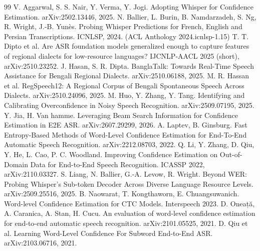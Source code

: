 \documentclass[10pt]{article}
\begin{document}
\begin{thebibliography}{99}
 V. Aggarwal, S. S. Nair, Y. Verma, Y. Jogi. Adopting Whisper for Confidence Estimation. arXiv:2502.13446, 2025.
 N. Ballier, L. Burin, B. Namdarzadeh, S. Ng, R. Wright, J.-B. Yunès. Probing Whisper Predictions for French, English and Persian Transcriptions. ICNLSP, 2024. (ACL Anthology 2024.icnlsp-1.15)
 T. T. Dipto et al. Are ASR foundation models generalized enough to capture features of regional dialects for low-resource languages? IJCNLP-AACL 2025 (short), arXiv:2510.23252.
 J. Hasan, S. R. Dipta. BanglaTalk: Towards Real-Time Speech Assistance for Bengali Regional Dialects. arXiv:2510.06188, 2025.
 M. R. Hassan et al. RegSpeech12: A Regional Corpus of Bengali Spontaneous Speech Across Dialects. arXiv:2510.24096, 2025.
 M. Huo, Y. Zhang, Y. Tang. Identifying and Calibrating Overconfidence in Noisy Speech Recognition. arXiv:2509.07195, 2025.
 Y. Jia, H. Van hamme. Leveraging Beam Search Information for Confidence Estimation in E2E ASR. arXiv:2607.29299, 2026.
 A. Laptev, B. Ginsburg. Fast Entropy-Based Methods of Word-Level Confidence Estimation for End-To-End Automatic Speech Recognition. arXiv:2212.08703, 2022.
 Q. Li, Y. Zhang, D. Qiu, Y. He, L. Cao, P. C. Woodland. Improving Confidence Estimation on Out-of-Domain Data for End-to-End Speech Recognition. ICASSP 2022, arXiv:2110.03327.
 S. Liang, N. Ballier, G.-A. Levow, R. Wright. Beyond WER: Probing Whisper's Sub-token Decoder Across Diverse Language Resource Levels. arXiv:2509.25516, 2025.
 B. Naowarat, T. Kongthaworn, E. Chuangsuwanich. Word-level Confidence Estimation for CTC Models. Interspeech 2023.
 D. Oneață, A. Caranica, A. Stan, H. Cucu. An evaluation of word-level confidence estimation for end-to-end automatic speech recognition. arXiv:2101.05525, 2021.
 D. Qiu et al. Learning Word-Level Confidence For Subword End-to-End ASR. arXiv:2103.06716, 2021.
\end{thebibliography}
\end{document}
